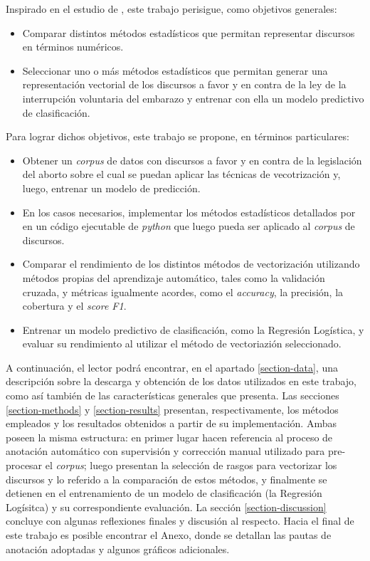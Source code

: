 Inspirado en el estudio de \cite{monroe2008fightin}, este trabajo
perisigue, como objetivos generales:

\begin{itemize}
    \item{Comparar distintos m\'etodos estad\'isticos que permitan representar
    discursos en t\'erminos num\'ericos.}
    \item{Seleccionar uno o más m\'etodos estad\'isticos que permitan
    generar una representación vectorial de los discursos a favor y en
    contra de la ley de la interrupción voluntaria del embarazo y entrenar
    con ella un modelo predictivo de clasificación.}
\end{itemize}

Para lograr dichos objetivos, este trabajo se propone, en términos
particulares:

\begin{itemize}
    \item{Obtener un \textit{corpus} de datos con discursos a favor y en contra
    de la legislación del aborto sobre el cual se puedan aplicar las técnicas de
    vecotrización y, luego, entrenar un modelo de predicción.}
    \item{En los casos necesarios, implementar los métodos estadísticos detallados
    por \cite{monroe2008fightin} en un código ejecutable de \textit{python} que
    luego pueda ser aplicado al \textit{corpus} de discursos.}
    \item{Comparar el rendimiento de los distintos métodos de vectorización utilizando
    métodos propias del aprendizaje automático, tales como la validación
    cruzada, y métricas igualmente acordes, como el \textit{accuracy}, la precisión,
    la cobertura y el \textit{score F1}.}
    \item{Entrenar un modelo predictivo de clasificación, como la Regresión Logística,
    y evaluar su rendimiento al utilizar el método de vectoriazión seleccionado.}
\end{itemize}

A continuación, el lector podrá encontrar, en el apartado \ref{section-data},
una descripción sobre la descarga y obtención de los datos utilizados en este
trabajo, como así también de las características generales que presenta. Las
secciones \ref{section-methods} y \ref{section-results} presentan, respectivamente,
los métodos empleados y los resultados obtenidos a partir de su implementación.
Ambas poseen la misma estructura: en primer lugar hacen referencia
al proceso de anotación automático con supervisión y corrección manual utilizado
para pre-procesar el \textit{corpus}; luego presentan la selección de rasgos
para vectorizar los discursos y lo referido a la comparación de estos métodos, y
finalmente se detienen en el entrenamiento de un modelo de clasificación (la
Regresión Logísitca) y su correspondiente evaluación. La sección
\ref{section-discussion} concluye con algunas reflexiones finales y
discusión al respecto. Hacia el final de este trabajo es posible encontrar el
Anexo, donde se detallan las pautas de anotación adoptadas y algunos gráficos
adicionales.
